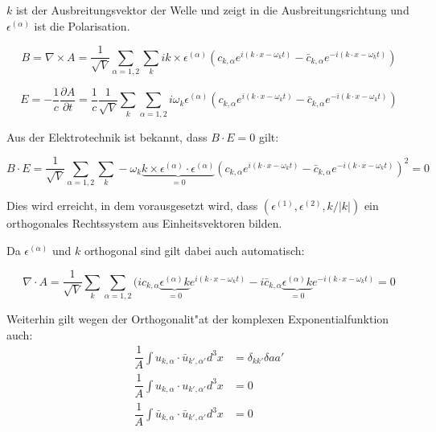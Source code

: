 $k$ ist der Ausbreitungsvektor der Welle und zeigt in die Ausbreitungsrichtung und $\epsilon^{(\alpha)}$ ist die Polarisation. 

\begin{equation}
B = \nabla \times A = \frac{1}{ \sqrt{V}} \sum_{\alpha=1,2}  \sum_k ik \times \epsilon^{(\alpha)} (c_{k,\alpha} e^{i (k \cdot x - \omega_k t)} - \bar{c}_{k,\alpha} e^{-i(k \cdot x - \omega_k t)})
\end{equation}

\begin{equation}
E = -\frac{1}{c} \frac{\partial A}{\partial t} = \frac{1}{c} \frac{1}{\sqrt{V}} \sum_k \sum_{\alpha=1,2} i \omega_k \epsilon^{(\alpha)} (c_{k,\alpha} e^{i (k \cdot x - \omega_k t)} - \bar{c}_{k,\alpha} e^{-i(k \cdot x - \omega_k t)})
\end{equation}

Aus der Elektrotechnik ist bekannt, dass $B \cdot E = 0$ gilt:

\begin{equation}
B \cdot E = \frac{1}{\sqrt{V}} \sum_{\alpha=1,2}   \sum_k -\omega_k \underbrace{k \times  \epsilon^{(\alpha)} \cdot \epsilon^{(\alpha)}}_{=0} (c_{k,\alpha} e^{i (k \cdot x - \omega_k t)} - \bar{c}_{k,\alpha} e^{-i(k \cdot x - \omega_k t)})^2 = 0
\end{equation}

Dies wird erreicht, in dem vorausgesetzt wird, dass $(\epsilon^{(1)}, \epsilon^{(2)} , k/|k|)$ ein orthogonales Rechtssystem aus Einheitsvektoren bilden.

Da $\epsilon^{(\alpha)}$ und $k$ orthogonal sind gilt dabei auch automatisch:

\begin{equation}
\nabla \cdot A = \frac{1}{\sqrt{V}} \sum_k \sum_{\alpha=1,2} (i c_{k,\alpha} \underbrace{\epsilon^{(\alpha)} k}_{=0} e^{i (k \cdot x - \omega_k t)} - i \bar{c}_{k,\alpha} \underbrace{\epsilon^{(\alpha)} k}_{=0} e^{-i(k \cdot x - \omega_k t)} = 0
\end{equation}

Weiterhin gilt wegen der Orthogonalit"at der komplexen Exponentialfunktion auch:
\begin{equation}
\begin{split}
\dfrac{1}{A} \int u_{k,\alpha} \cdot \bar{u}_{k',\alpha'} d^3 x &= \delta_{kk'}\delta{aa'} \\
\dfrac{1}{A} \int u_{k,\alpha} \cdot u_{k',\alpha'} d^3 x &= 0 \\
\dfrac{1}{A} \int \bar{u}_{k,\alpha} \cdot \bar{u}_{k',\alpha'} d^3 x &= 0
\end{split}
\end{equation}

